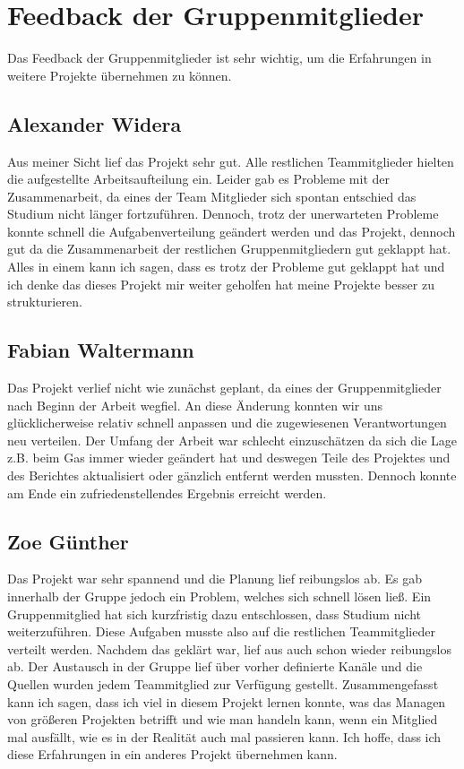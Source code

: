 \documentclass[a4paper,12pt]{scrartcl}
\begin{document}
\section{Feedback der Gruppenmitglieder}
Das Feedback der Gruppenmitglieder ist sehr wichtig, um die Erfahrungen in weitere Projekte übernehmen zu können.

\subsection{Alexander Widera}
Aus meiner Sicht lief das Projekt sehr gut. Alle restlichen Teammitglieder hielten die aufgestellte Arbeitsaufteilung ein. Leider gab es Probleme mit der Zusammenarbeit, da eines der Team Mitglieder sich spontan entschied das Studium nicht länger fortzuführen. Dennoch, trotz der unerwarteten Probleme konnte schnell die Aufgabenverteilung geändert werden und das Projekt, dennoch gut da die Zusammenarbeit der restlichen Gruppenmitgliedern gut geklappt hat. Alles in einem kann ich sagen, dass es trotz der Probleme gut geklappt hat und ich denke das dieses Projekt mir weiter geholfen hat meine Projekte besser zu strukturieren.

\subsection{Fabian Waltermann}
Das Projekt verlief nicht wie zunächst geplant, da eines der Gruppenmitglieder nach Beginn der Arbeit wegfiel. An diese Änderung konnten wir uns glücklicherweise relativ schnell anpassen und die zugewiesenen Verantwortungen neu verteilen. Der Umfang der Arbeit war schlecht einzuschätzen da sich die Lage z.B. beim Gas immer wieder geändert hat und deswegen Teile des Projektes und des Berichtes aktualisiert oder gänzlich entfernt werden mussten. Dennoch konnte am Ende ein zufriedenstellendes Ergebnis erreicht werden.

\subsection{Zoe Günther}
Das Projekt war sehr spannend und die Planung lief reibungslos ab. Es gab innerhalb der Gruppe jedoch ein Problem, welches sich schnell lösen ließ. Ein Gruppenmitglied hat sich kurzfristig dazu entschlossen, dass Studium nicht weiterzuführen. Diese Aufgaben musste also auf die restlichen Teammitglieder verteilt werden. Nachdem das geklärt war, lief aus auch schon wieder reibungslos ab. Der Austausch in der Gruppe lief über vorher definierte Kanäle und die Quellen wurden jedem Teammitglied zur Verfügung gestellt.
Zusammengefasst kann ich sagen, dass ich viel in diesem Projekt lernen konnte, was das Managen von größeren Projekten betrifft und wie man handeln kann, wenn ein Mitglied mal ausfällt, wie es in der Realität auch mal passieren kann. Ich hoffe, dass ich diese Erfahrungen in ein anderes Projekt übernehmen kann.
\end{document}
